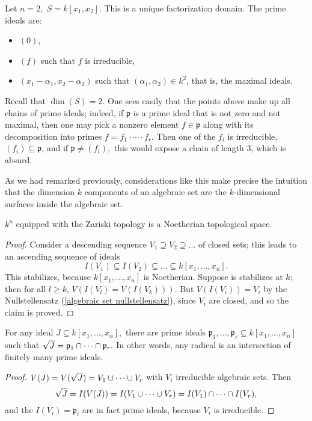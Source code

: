 \begin{example}
  Let \(n=2,\) \(S = k[x_1, x_2].\)
  This is a unique factorization domain. The prime ideals are:
  \begin{itemize}
  \item \((0)\),
  \item \((f)\) such that \(f\) is irreducible,
  \item \((x_1 - \alpha_1, x_2 - \alpha_2)\) such that \((\alpha_1, \alpha_2) \in k^2\), that is, the maximal ideals.
  \end{itemize}
  Recall that \(\dim(S) = 2.\) One sees easily that the points above make up all chains of prime ideals; indeed, if \(\mathfrak p\) is a prime ideal that is not zero and not maximal, then one may pick a nonzero element \(f \in \mathfrak p\) along with its decomposition into primes \(f = f_1 \cdot \dotsm \cdot f_r\). Then one of the \(f_i\) is irreducible, \((f_i) \subseteq \mathfrak p\), and if \(\mathfrak p \neq (f_i),\) this would expose a chain of length \(3\), which is absurd.

  As we had remarked previously, considerations like this make precise the intuition that the dimension \(k\) components of an algebraic set are the \(k\)-dimensional surfaces inside the algebraic set.
\end{example}

\begin{lemma}
  \(k^n\) equipped with the Zariski topology is a Noetherian topological space.
\end{lemma}
\begin{proof}
  Consider a descending sequence \(V_1 \supseteq V_2 \supseteq \dotso\) of closed sets; this leads to an ascending sequence of ideals
  \[I(V_1) \subseteq I(V_2) \subseteq \dotso \subseteq k[x_1, \dotsc, x_n].\]
  This stabilizes, because \(k[x_1, \dotsc, x_n]\) is Noetherian. Suppose is stabilizes at \(k\); then for all \(l \geq k\),
  \(V(I(V_l) = V(I(V_k))).\)
  But \(V(I(V_i)) = V_i\) by the Nullstellensatz (\cref{algebraic set nullstellensatz}), since \(V_i\) are closed,
  and so the claim is proved.
\end{proof}

\begin{corollary}
  For any ideal \(J \subseteq k[x_1, \dotsc, x_n],\) there are prime ideals
  \(\mathfrak p_1, \dotsc, \mathfrak p_r \subseteq k[x_1, \dotsc, x_n]\)
  such that
  \(\sqrt{J} = \mathfrak p_1 \cap \dotsb \cap \mathfrak p_r.\)
  In other words, any radical is an intersection of finitely many prime ideals.
\end{corollary}
\begin{proof}
  \(V(J) = V(\sqrt{J}) = V_1 \cup \dotsb \cup V_r\) with \(V_i\) irreducible algebraic sets. Then
  \[\sqrt{J} = I(V(J)) = I(V_1 \cup \dotsb \cup V_r) = I(V_1) \cap \dotsb \cap I(V_r),\]
  and the \(I(V_i) = \mathfrak p_i\) are in fact prime ideals, because \(V_i\) is irreducible.
\end{proof}






